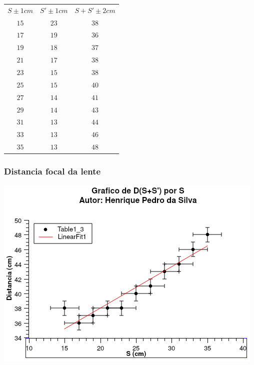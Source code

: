 \documentclass[12pt,twoside, a4paper, twocolumn]{article}
\begin{document}
\begin{center}
  \begin{tabular}{ |c|c|c| }
    \hline
    $S \pm 1cm$ & $S' \pm 1cm$ & $S+S' \pm 2cm$ \\
    $15$        & $23$         & $38$           \\
    $17$        & $19$         & $36$           \\
    $19$        & $18$         & $37$           \\
    $21$        & $17$         & $38$           \\
    $23$        & $15$         & $38$           \\
    $25$        & $15$         & $40$           \\
    $27$        & $14$         & $41$           \\
    $29$        & $14$         & $43$           \\
    $31$        & $13$         & $44$           \\
    $33$        & $13$         & $46$           \\
    $35$        & $13$         & $48$           \\


    \hline
  \end{tabular}
\end{center}

\subsubsection*{Distancia focal da lente}


\begin{adjustbox}{scale=0.70}
  \includegraphics{Graph1.png}
\end{adjustbox}
\end{document}
